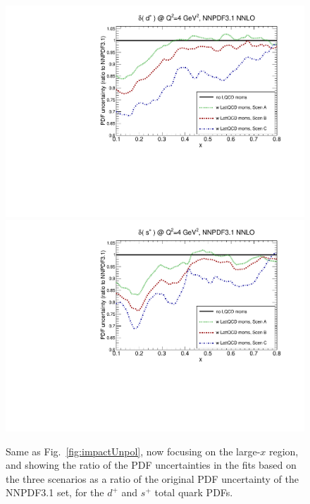 \begin{figure}[!t]
\centering
\includegraphics[scale=0.45]{plots/xdp-unpol-lattice-relerr-largex.pdf}
\includegraphics[scale=0.45]{plots/xsp-unpol-lattice-relerr-largex.pdf}
\caption{\small Same as Fig.~\ref{fig:impactUnpol}, now focusing
  on the large-$x$ region, and showing the ratio of the
  PDF uncertainties in the fits based on the three scenarios
  as a ratio of the original
  PDF uncertainty of the NNPDF3.1 set, for the $d^+$
  and $s^+$ total quark PDFs.
}    
\label{fig:impactUnpollargex}
\end{figure}

